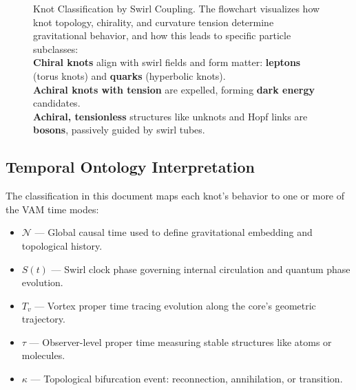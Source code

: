 \documentclass[12pt]{article}
\begin{document}
\begin{figure}[H]
{
    }
    \caption{Knot Classification by Swirl Coupling.
        The flowchart visualizes how knot topology, chirality, and curvature tension determine gravitational behavior, and how this leads to specific particle subclasses:
            \\ \textbf{Chiral knots} align with swirl fields and form matter: \textbf{leptons} (torus knots) and \textbf{quarks} (hyperbolic knots).
            \\ \textbf{Achiral knots with tension} are expelled, forming \textbf{dark energy} candidates.
            \\ \textbf{Achiral, tensionless} structures like unknots and Hopf links are \textbf{bosons}, passively guided by swirl tubes.
    }
\end{figure}

\subsection*{Temporal Ontology Interpretation}

The classification in this document maps each knot's behavior to one or more of the VAM time modes:

\begin{itemize}
    \item $\mathcal{N}$ — Global causal time used to define gravitational embedding and topological history.
    \item $S(t)$ — Swirl clock phase governing internal circulation and quantum phase evolution.
    \item $T_v$ — Vortex proper time tracing evolution along the core's geometric trajectory.
    \item $\tau$ — Observer-level proper time measuring stable structures like atoms or molecules.
    \item $\kappa$ — Topological bifurcation event: reconnection, annihilation, or transition.
\end{itemize}
\end{document}
